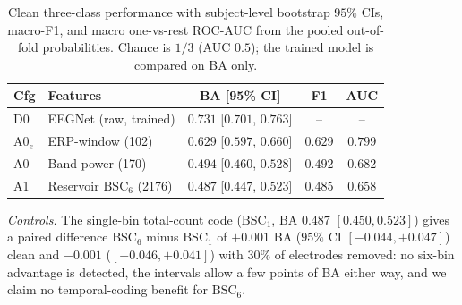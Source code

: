 \documentclass[conference]{IEEEtran}
\newcommand{\BSC}{\ensuremath{\mathrm{BSC}_{6}}}
\begin{document}
\begin{table}[t]
\caption{Clean three-class performance with subject-level bootstrap $95\%$ CIs, macro-F1, and macro one-vs-rest ROC-AUC from the pooled out-of-fold probabilities. Chance is $1/3$ (AUC $0.5$); the trained model is compared on BA only.}
\label{tab:clean}
\centering
\small
\setlength{\tabcolsep}{2pt}
\begin{tabular}{llccc}
\toprule
Cfg & Features & BA [95\% CI] & F1 & AUC \\
\midrule
D0 & EEGNet (raw, trained) & $0.731$ [$0.701$, $0.763$] & -- & -- \\
A0$_e$ & ERP-window (102) & $0.629$ [$0.597$, $0.660$] & $0.629$ & $0.799$ \\
A0 & Band-power (170) & $0.494$ [$0.460$, $0.528$] & $0.492$ & $0.682$ \\
A1 & Reservoir \BSC{} (2176) & $0.487$ [$0.447$, $0.523$] & $0.485$ & $0.658$ \\
\bottomrule
\end{tabular}
\end{table}

\emph{Controls.} The single-bin total-count code (BSC$_1$, BA $0.487$ $[0.450,0.523]$) gives a paired difference \BSC{} minus BSC$_1$ of $+0.001$ BA ($95\%$ CI $[-0.044,+0.047]$) clean and $-0.001$ ($[-0.046,+0.041]$) with $30\%$ of electrodes removed: no six-bin advantage is detected, the intervals allow a few points of BA either way, and we claim no temporal-coding benefit for \BSC{}.
\end{document}
